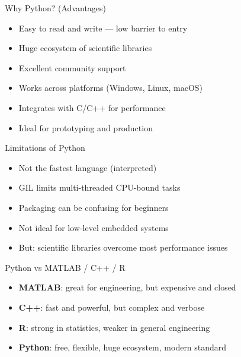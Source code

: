 \documentclass[aspectratio=169]{beamer}
\begin{document}
\begin{frame}{Why Python? (Advantages)}
  \begin{itemize}
    \item Easy to read and write — low barrier to entry
    \item Huge ecosystem of scientific libraries
    \item Excellent community support
    \item Works across platforms (Windows, Linux, macOS)
    \item Integrates with C/C++ for performance
    \item Ideal for prototyping and production
  \end{itemize}
\end{frame}

\begin{frame}{Limitations of Python}
  \begin{itemize}
    \item Not the fastest language (interpreted)
    \item GIL limits multi-threaded CPU-bound tasks
    \item Packaging can be confusing for beginners
    \item Not ideal for low-level embedded systems
    \item But: scientific libraries overcome most performance issues
  \end{itemize}
\end{frame}

\begin{frame}{Python vs MATLAB / C++ / R}
  \begin{itemize}
    \item \textbf{MATLAB}: great for engineering, but expensive and closed
    \item \textbf{C++}: fast and powerful, but complex and verbose
    \item \textbf{R}: strong in statistics, weaker in general engineering
    \item \textbf{Python}: free, flexible, huge ecosystem, modern standard
  \end{itemize}
\end{frame}
\end{document}
